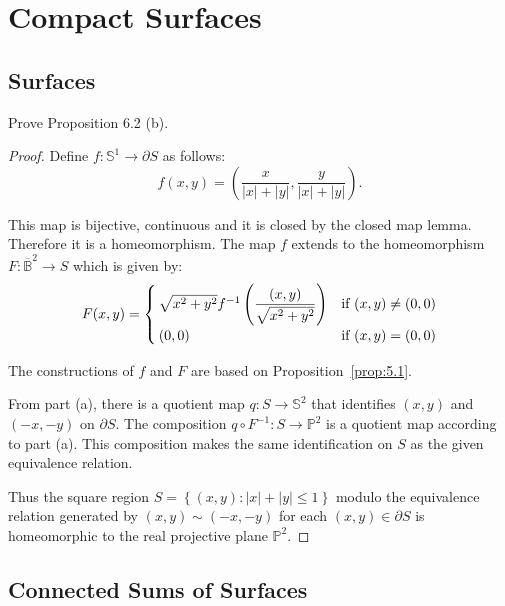 \chapter{Compact Surfaces}

\section{Surfaces}

\begin{exercise}{6.3}
	Prove Proposition 6.2 (b).
\end{exercise}

\begin{proof}
	Define \( f: \mathbb{S}^{1} \to \partial S \) as follows:
	\[
		f(x, y) = \left(\frac{x}{\left\vert x\right\vert + \left\vert y\right\vert}, \frac{y}{\left\vert x\right\vert + \left\vert y\right\vert}\right).
	\]

	This map is bijective, continuous and it is closed by the closed map lemma. Therefore it is a homeomorphism. The map \( f \) extends to the homeomorphism \( F: \overline{\mathbb{B}}^{2} \to S \) which is given by:
	\[
		F(x, y) = \begin{cases}
			\sqrt{x^{2} + y^{2}} f^{-1}\left(\dfrac{(x, y)}{\sqrt{x^{2} + y^{2}}}\right) & \text{if \( (x, y) \ne (0, 0) \)} \\
			(0, 0)                                                                       & \text{if \( (x, y) = (0, 0) \)}
		\end{cases}
	\]

	The constructions of \( f \) and \( F \) are based on Proposition~\ref{prop:5.1}.

	From part (a), there is a quotient map \( q: S \to \mathbb{S}^{2} \) that identifies \( (x, y) \) and \( (-x, -y) \) on \( \partial S \). The composition \( q\circ F^{-1}: S \to \mathbb{P}^{2} \) is a quotient map according to part (a). This composition makes the same identification on \( S \) as the given equivalence relation.

	Thus the square region \( S = \left\{ (x, y): \left\vert x \right\vert + \left\vert y \right\vert \leq 1 \right\} \) modulo the equivalence relation generated by \( (x, y) \sim (-x, -y) \) for each \( (x, y) \in \partial S \) is homeomorphic to the real projective plane \( \mathbb{P}^{2} \).
\end{proof}

\section{Connected Sums of Surfaces}

